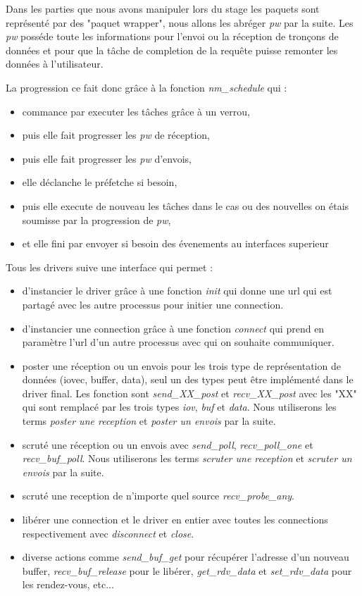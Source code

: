 Dans les parties que nous avons manipuler lors du stage les paquets sont représenté par des "paquet wrapper",
nous allons les abréger \emph{pw} par la suite.
Les \emph{pw} posséde toute les informations pour l'envoi ou la réception de tronçons de données et pour que la tâche de completion de la requête puisse remonter les données à l'utilisateur.

La progression ce fait donc grâce à la fonction \emph{nm_schedule} qui :
\begin{itemize}
  \item commance par executer les tâches grâce à un verrou,
  \item puis elle fait progresser les \emph{pw} de réception,
  \item puis elle fait progresser les \emph{pw} d'envois,
  \item elle déclanche le préfetche si besoin,
  \item puis elle execute de nouveau les tâches dans le cas ou des nouvelles on étais soumisse par la progression de \emph{pw},
  \item et elle fini par envoyer si besoin des évenements au interfaces superieur
\end{itemize}

Tous les drivers suive une interface qui permet :

\begin{itemize}
  \item d'instancier le driver grâce à une fonction \emph{init} qui donne une url qui est partagé avec les autre processus pour initier une connection. %
  \item d'instancier une connection grâce à une fonction \emph{connect} qui prend en paramètre l'url d'un autre processus avec qui on souhaite communiquer. %
  \item poster une réception ou un envois pour les trois type de représentation de données (iovec, buffer, data),
  seul un des types peut être implémenté dans le driver final.
  Les fonction sont \emph{send_XX_post} et \emph{recv_XX_post} avec les "XX" qui sont remplacé par les trois types \emph{iov}, \emph{buf} et \emph{data}.
  Nous utiliserons les terms \emph{poster une reception} et \emph{poster un envois} par la suite.
  \item scruté une réception ou un envois avec \emph{send_poll}, \emph{recv_poll_one} et \emph{recv_buf_poll}.
  Nous utiliserons les terms \emph{scruter une reception} et \emph{scruter un envois} par la suite.
  \item scruté une reception de n'importe quel source \emph{recv_probe_any}.
  \item libérer une connection et le driver en entier avec toutes les connections respectivement avec \emph{disconnect} et \emph{close}.
  \item diverse actions comme \emph{send_buf_get} pour récupérer l'adresse d'un nouveau buffer, \emph{recv_buf_release} pour le libérer, \emph{get_rdv_data} et \emph{set_rdv_data} pour les rendez-vous, etc...
\end{itemize}

